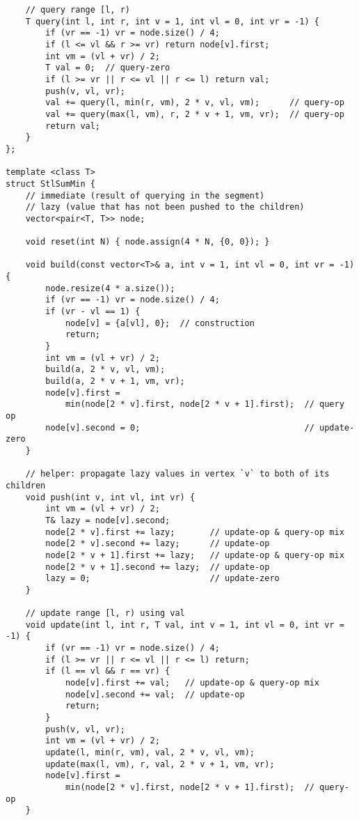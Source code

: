 \documentclass[twoside]{article}
\begin{document}
\begin{multicols*}{2}
\begin{verbatim}
    // query range [l, r)
    T query(int l, int r, int v = 1, int vl = 0, int vr = -1) {
        if (vr == -1) vr = node.size() / 4;
        if (l <= vl && r >= vr) return node[v].first;
        int vm = (vl + vr) / 2;
        T val = 0;  // query-zero
        if (l >= vr || r <= vl || r <= l) return val;
        push(v, vl, vr);
        val += query(l, min(r, vm), 2 * v, vl, vm);      // query-op
        val += query(max(l, vm), r, 2 * v + 1, vm, vr);  // query-op
        return val;
    }
};

template <class T>
struct StlSumMin {
    // immediate (result of querying in the segment)
    // lazy (value that has not been pushed to the children)
    vector<pair<T, T>> node;

    void reset(int N) { node.assign(4 * N, {0, 0}); }

    void build(const vector<T>& a, int v = 1, int vl = 0, int vr = -1) {
        node.resize(4 * a.size());
        if (vr == -1) vr = node.size() / 4;
        if (vr - vl == 1) {
            node[v] = {a[vl], 0};  // construction
            return;
        }
        int vm = (vl + vr) / 2;
        build(a, 2 * v, vl, vm);
        build(a, 2 * v + 1, vm, vr);
        node[v].first =
            min(node[2 * v].first, node[2 * v + 1].first);  // query op
        node[v].second = 0;                                 // update-zero
    }

    // helper: propagate lazy values in vertex `v` to both of its children
    void push(int v, int vl, int vr) {
        int vm = (vl + vr) / 2;
        T& lazy = node[v].second;
        node[2 * v].first += lazy;       // update-op & query-op mix
        node[2 * v].second += lazy;      // update-op
        node[2 * v + 1].first += lazy;   // update-op & query-op mix
        node[2 * v + 1].second += lazy;  // update-op
        lazy = 0;                        // update-zero
    }

    // update range [l, r) using val
    void update(int l, int r, T val, int v = 1, int vl = 0, int vr = -1) {
        if (vr == -1) vr = node.size() / 4;
        if (l >= vr || r <= vl || r <= l) return;
        if (l == vl && r == vr) {
            node[v].first += val;   // update-op & query-op mix
            node[v].second += val;  // update-op
            return;
        }
        push(v, vl, vr);
        int vm = (vl + vr) / 2;
        update(l, min(r, vm), val, 2 * v, vl, vm);
        update(max(l, vm), r, val, 2 * v + 1, vm, vr);
        node[v].first =
            min(node[2 * v].first, node[2 * v + 1].first);  // query-op
    }


\end{verbatim}
\end{multicols*}
\end{document}
